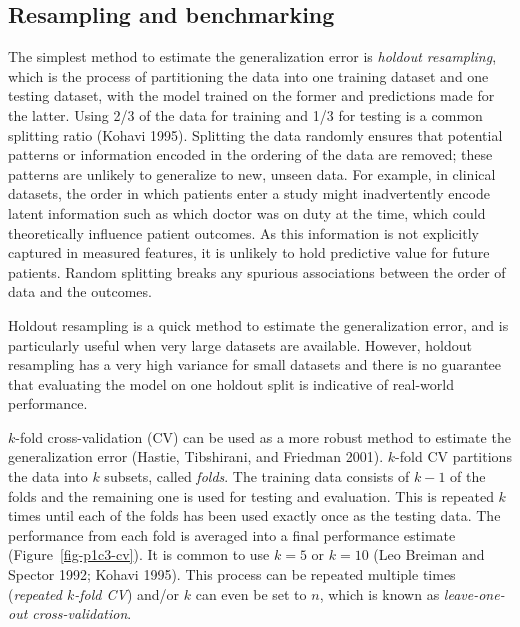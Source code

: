 \documentclass[
  letterpaper,
  krantz2]{style/krantz}
\begin{document}
\subsection{Resampling and benchmarking}\label{sec-ml-resampling}

The simplest method to estimate the generalization error is
\emph{holdout resampling}, which is the
process of partitioning the data into one training dataset and one
testing dataset, with the model trained on the former and predictions
made for the latter. Using 2/3 of the data for training and 1/3 for
testing is a common splitting ratio (Kohavi 1995). Splitting the data
randomly ensures that potential patterns or information encoded in the
ordering of the data are removed; these patterns are unlikely to
generalize to new, unseen data. For example, in clinical datasets, the
order in which patients enter a study might inadvertently encode latent
information such as which doctor was on duty at the time, which could
theoretically influence patient outcomes. As this information is not
explicitly captured in measured features, it is unlikely to hold
predictive value for future patients. Random splitting breaks any
spurious associations between the order of data and the outcomes.

Holdout resampling is a quick method to estimate the generalization
error, and is particularly useful when very large datasets are
available. However, holdout resampling has a very high variance for
small datasets and there is no guarantee that evaluating the model on
one holdout split is indicative of real-world performance.

\(k\)-fold cross-validation (CV) can
be used as a more robust method to estimate the generalization
error (Hastie, Tibshirani, and Friedman
2001). \(k\)-fold CV partitions the data into \(k\) subsets, called
\emph{folds}. The training data consists of \(k-1\) of the folds and the
remaining one is used for testing and evaluation. This is repeated \(k\)
times until each of the folds has been used exactly once as the testing
data. The performance from each fold is averaged into a final
performance estimate (Figure~\ref{fig-p1c3-cv}). It is common to use
\(k = 5\) or \(k = 10\) (Leo Breiman and Spector 1992; Kohavi 1995).
This process can be repeated multiple times (\emph{repeated \(k\)-fold
CV}) and/or \(k\) can even be set to
\(n\), which is known as \emph{leave-one-out cross-validation}.
\end{document}
